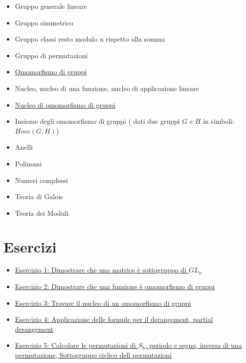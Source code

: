 \documentclass[a4paper,10pt]{article}
\begin{document}
\begin{itemize}
 \item Gruppo generale lineare
 \item Gruppo simmetrico 
 \item Gruppo classi resto modulo n rispetto alla somma
 \item Gruppo di permutazioni
 
 \item \href{./OmomorfismoGruppi.html}{Omomorfismo di gruppi}
 \item Nucleo, nucleo di una funzione, nucleo di applicazione lineare
 \item \href{./Nucleo.html}{Nucleo di omomorfismo di gruppi}
 \item Insieme degli omomorfismo di gruppi ( dati due gruppi $G$ e $H$ in simboli: $Hom(G,H)$)
 
 \item Anelli
 \item Polinomi
 \item Numeri complessi
 \item Teoria di Galois
 \item Teoria dei Moduli
\end{itemize}

\section{Esercizi}
\begin{itemize}
 \item \href{./esercizio1.html}{Esercizio 1: Dimostrare che una matrice è sottogruppo di $GL_{n}$}
 \item \href{./esercizio2.html}{Esercizio 2: Dimostrare che una funzione è omomorfismo di gruppi}
 \item \href{./esercizio3.html}{Esercizio 3: Trovare il nucleo di un omomorfismo di gruppi}
 \item \href{./esercizio4.html}{Esercizio 4: Applicazione delle formule per il derangement, partial derangement}
 \item \href{./esercizio5.html}{Esercizio 5: Calcolare le permutazioni di $S_{8}$, periodo e segno, inversa di una permutazione, Sottogruppo ciclico dell permutazioni}
\end{itemize}
\end{document}
